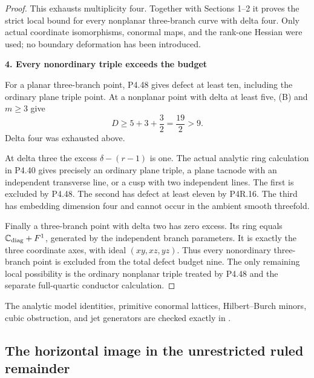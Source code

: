 \begin{proof}
This exhausts multiplicity four. Together with Sections 1--2 it proves the strict local bound for every nonplanar three-branch curve with delta four. Only actual coordinate isomorphisms, conormal maps, and the rank-one Hessian were used; no boundary deformation has been introduced.

\par\medskip\noindent\textbf{4. Every nonordinary triple exceeds the budget}\par\label{every-nonordinary-triple-exceeds-the-budget}

For a planar three-branch point, P4.48 gives defect at least ten, including the ordinary plane triple point. At a nonplanar point with delta at least five, (B) and \(m\ge3\) give \[
                  D\ge5+3+\frac32=\frac{19}{2}>9.
\] Delta four was exhausted above.

At delta three the excess \(\delta-(r-1)\) is one. The actual analytic ring calculation in P4.40 gives precisely an ordinary plane triple, a plane tacnode with an independent transverse line, or a cusp with two independent lines. The first is excluded by P4.48. The second has defect at least eleven by P4R.16. The third has embedding dimension four and cannot occur in the ambient smooth threefold.

Finally a three-branch point with delta two has zero excess. Its ring equals \(\mathbb C_{\rm diag}+F^1\), generated by the independent branch parameters. It is exactly the three coordinate axes, with ideal \((xy,xz,yz)\). Thus every nonordinary three-branch point is excluded from the total defect budget nine. The only remaining local possibility is the ordinary nonplanar triple treated by P4.48 and the separate full-quartic conductor calculation.

\end{proof}

The analytic model identities, primitive conormal lattices,
Hilbert--Burch minors, cubic obstruction, and jet generators are
checked exactly in .


\subsection{The horizontal image in the unrestricted ruled remainder}

